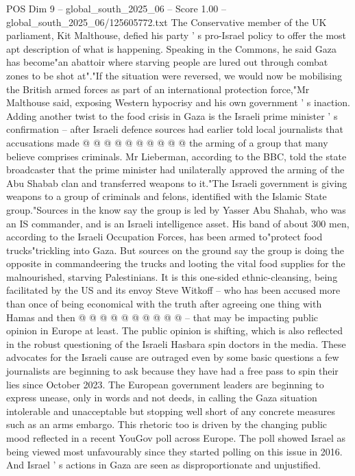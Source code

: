 \begin{textsample}{POS Dim 9 – global\_south\_2025\_06 – Score 1.00 – global\_south\_2025\_06/125605772.txt}
The Conservative member of the UK parliament, Kit Malthouse, defied his party ' s pro-Israel policy to offer the most apt description of what is happening.
Speaking in the Commons, he said Gaza has become"an abattoir where starving people are lured out through combat zones to be shot at"."If the situation were reversed, we would now be mobilising the British armed forces as part of an international protection force,"Mr Malthouse said, exposing Western hypocrisy and his own government ' s inaction.
Adding another twist to the food crisis in Gaza is the Israeli prime minister ' s confirmation -- after Israeli defence sources had earlier told local journalists that accusations made @ @ @ @ @ @ @ @ @ @ the arming of a group that many believe comprises criminals.
Mr Lieberman, according to the BBC, told the state broadcaster that the prime minister had unilaterally approved the arming of the Abu Shabab clan and transferred weapons to it."The Israeli government is giving weapons to a group of criminals and felons, identified with the Islamic State group."Sources in the know say the group is led by Yasser Abu Shahab, who was an IS commander, and is an Israeli intelligence asset.
His band of about 300 men, according to the Israeli Occupation Forces, has been armed to"protect food trucks"trickling into Gaza.
But sources on the ground say the group is doing the opposite in commandeering the trucks and looting the vital food supplies for the malnourished, starving Palestinians.
It is this one-sided ethnic-cleansing, being facilitated by the US and its envoy Steve Witkoff -- who has been accused more than once of being economical with the truth after agreeing one thing with Hamas and then @ @ @ @ @ @ @ @ @ @ -- that may be impacting public opinion in Europe at least.
The public opinion is shifting, which is also reflected in the robust questioning of the Israeli Hasbara spin doctors in the media.
These advocates for the Israeli cause are outraged even by some basic questions a few journalists are beginning to ask because they have had a free pass to spin their lies since October 2023.
The European government leaders are beginning to express unease, only in words and not deeds, in calling the Gaza situation intolerable and unacceptable but stopping well short of any concrete measures such as an arms embargo.
This rhetoric too is driven by the changing public mood reflected in a recent YouGov poll across Europe.
The poll showed Israel as being viewed most unfavourably since they started polling on this issue in 2016.
And Israel ' s actions in Gaza are seen as disproportionate and unjustified.

\end{textsample}
